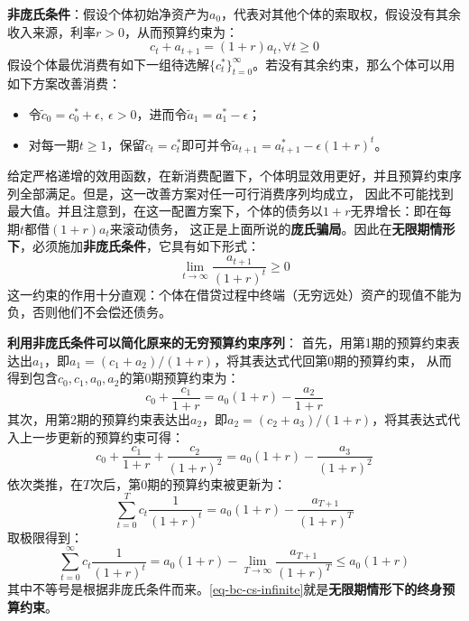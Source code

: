 \begin{example} \label{eg-npg-condition}
    \textbf{非庞氏条件}：假设个体初始净资产为$a_0$，代表对其他个体的索取权，假设没有其余收入来源，利率$r>0$，从而预算约束为：
    \begin{equation*}
        c_t+a_{t+1}=(1+r) a_t, \forall t \geq 0
    \end{equation*}
    假设个体最优消费有如下一组待选解$\{c_t^*\}_{t=0}^{\infty}$。若没有其余约束，那么个体可以用如下方案改善消费：
    \begin{itemize}
        \item 令$\tilde{c}_0 = c_0^*+\epsilon,~\epsilon > 0$，进而令$\tilde{a}_1=a_1^*-\epsilon$；
        \item 对每一期$t\geq 1$，保留$\tilde{c}_t=c_t^*$即可并令$\tilde{a}_{t+1}=a_{t+1}^*-\epsilon(1+r)^t$。
    \end{itemize}
    给定严格递增的效用函数，在新消费配置下，个体明显效用更好，并且预算约束序列全部满足。但是，这一改善方案对任一可行消费序列均成立，
    因此不可能找到最大值。并且注意到，在这一配置方案下，个体的债务以$1+r$无界增长：即在每期$t$都借$(1+r)a_t$来滚动债务，
    这正是上面所说的\textbf{庞氏骗局}。因此在\textbf{无限期情形下}，必须施加\textbf{非庞氏条件}，它具有如下形式：
    \begin{equation}    \label{eq-npg-condition}
        \lim _{t \rightarrow \infty} \frac{a_{t+1}}{(1+r)^t} \geq 0
    \end{equation}
    这一约束的作用十分直观：个体在借贷过程中终端（无穷远处）资产的现值不能为负，否则他们不会偿还债务。

    \textbf{利用非庞氏条件可以简化原来的无穷预算约束序列}：
    首先，用第1期的预算约束表达出$a_1$，即$a_1 = (c_1+a_2)/(1+r)$，将其表达式代回第0期的预算约束，
    从而得到包含$c_0,c_1,a_0,a_2$的第0期预算约束为：
    \begin{equation*}
        c_0+\frac{c_1}{1+r} = a_0(1+r) - \frac{a_2}{1+r}
    \end{equation*}
    其次，用第2期的预算约束表达出$a_2$，即$a_2 = (c_2+a_3)/(1+r)$，将其表达式代入上一步更新的预算约束可得：
    \begin{equation*}
        c_0+\frac{c_1}{1+r}+\frac{c_2}{(1+r)^2} = a_0(1+r) - \frac{a_3}{(1+r)^2}
    \end{equation*}
    依次类推，在$T$次后，第0期的预算约束被更新为：
    \begin{equation*}
        \sum_{t=0}^T c_t \frac{1}{(1+r)^t}=a_0(1+r)-\frac{a_{T+1}}{(1+r)^T}
    \end{equation*}
    取极限得到：
    \begin{equation}    \label{eq-bc-cs-infinite}
        \sum_{t=0}^{\infty} c_t \frac{1}{(1+r)^t}
            = a_0(1+r)-\lim _{T \rightarrow \infty} \frac{a_{T+1}}{(1+r)^T} \leq a_0(1+r)
    \end{equation}
    其中不等号是根据非庞氏条件而来。\cref{eq-bc-cs-infinite}就是\textbf{无限期情形下的终身预算约束}。
\end{example}

